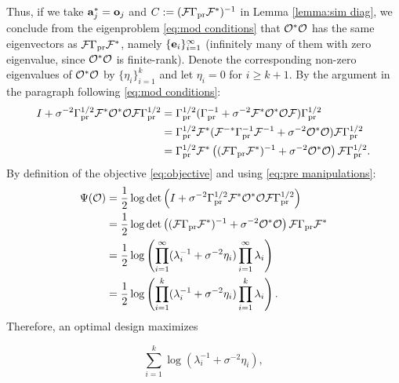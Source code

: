 \documentclass{amsart}
\numberwithin{equation}{section}
\begin{document}
Thus, if we take $\mathbf{a}_j^{*} = \mathbf{o}_j$ and $C := (\mathcal{F} \Gamma_{\textup{pr}}
\mathcal{F}^*)^{-1}$ in Lemma \ref{lemma:sim diag}, we conclude from the
eigenproblem \eqref{eq:mod conditions} that $\mathcal{O}^*\mathcal{O}$ has the same
eigenvectors as $\mathcal{F} \Gamma_{\textup{pr}} \mathcal{F}^*$, namely
$\{\mathbf{e}_i\}_{i=1}^{\infty}$ (infinitely many of them with zero
eigenvalue, since $\mathcal{O}^*\mathcal{O}$ is finite-rank). Denote the
corresponding non-zero eigenvalues of $\mathcal{O}^*\mathcal{O}$ by
$\{\eta_i\}_{i=1}^{k}$ and let $\eta_i = 0$ for $i \geq k+1$. By the argument
in the paragraph following \eqref{eq:mod conditions}:
\begin{align}\label{eq:pre manipulations}
  \begin{split}
    I + \sigma^{-2} \Gamma_{\textup{pr}}^{1/2}  \mathcal{F} ^* \mathcal{O}^* \mathcal{O} \mathcal{F} \Gamma_{\textup{pr}}^{1/2} &= 
    \Gamma_{\textup{pr}}^{1/2} ( \Gamma_{\textup{pr}}^{-1} + \sigma^{-2} \mathcal{F}^*\mathcal{O}^*  \mathcal{O} \mathcal{F} ) \Gamma_{\textup{pr}}^{1/2}\\
    &=\Gamma_{\textup{pr}}^{1/2} \mathcal{F}^* ( \mathcal{F}^{-*} \Gamma_{\textup{pr}}^{-1}\mathcal{F}^{-1} + \sigma^{-2} \mathcal{O}^* \mathcal{O}  ) \mathcal{F} \Gamma_{\textup{pr}}^{1/2}\\
    &= \Gamma_{\textup{pr}}^{1/2} \mathcal{F}^* \left ( (\mathcal{F} \Gamma_{\textup{pr}} \mathcal{F}^* )^{-1} +\sigma^{-2} \mathcal{O}^* \mathcal{O}  \right ) \mathcal{F} \Gamma_{\textup{pr}}^{1/2}.
  \end{split}
\end{align}
By definition of the objective \eqref{eq:objective} and using
\eqref{eq:pre manipulations}:
\begin{align}\label{eq:mod objective}
  \begin{split}
    \Psi ( \mathcal{O} ) &=\frac12 \log \det \left( I + \sigma^{-2}
    \Gamma_{\textup{pr}}^{1/2} \mathcal{F} ^* \mathcal{O}^* \mathcal{O} \mathcal{F} \Gamma_{\textup{pr}}^{1/2} \right )\\
    &=\frac12 \log \det
    \left ( (\mathcal{F} \Gamma_{\textup{pr}} \mathcal{F}^* )^{-1} + \sigma^{-2}\mathcal{O}^* \mathcal{O}  \right ) \mathcal{F} \Gamma_{\textup{pr}} \mathcal{F}^* \\ 
    &=\frac12 \log \left (\prod_{i=1}^{\infty} ( \lambda_i^{-1} + \sigma^{-2} \eta_i ) \prod_{i=1}^{\infty} \lambda_i \right ) \\
    &=\frac12 \log \left ( \prod_{i=1}^{k} ( \lambda_i^{-1} + \sigma^{-2} \eta_i )\prod_{i=1}^{k} \lambda_i \right ). 
  \end{split}
\end{align}
Therefore, an optimal design maximizes

\begin{equation}\label{eq:true target}
  \sum_{i=1}^{k}\log (\lambda_i^{-1} + \sigma^{-2} \eta_i),
\end{equation}
\end{document}
